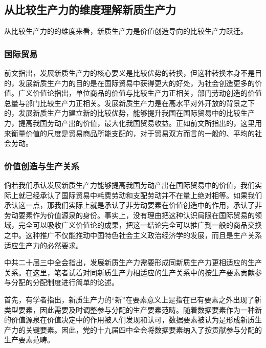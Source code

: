 \subsection{从比较生产力的维度理解新质生产力}

从比较生产力的的维度来看，新质生产力是价值创造导向的比较生产力跃迁。

\subsubsection{国际贸易}

前文指出，发展新质生产力的核心要义是比较优势的转换，但这种转换本身不是目的，发展新质生产力的目的是在国际贸易中获得更大的好处，为社会创造更多的价值。广义价值论指出，单位商品的价值与比较生产力正相关，部门劳动创造的价值总量与部门比较生产力正相关。发展新质生产力是在高水平对外开放的背景之下的\cite[518]{XiJinPingXiJinPingJingJiWenXuanDiYiJuan2025}，发展新质生产力建立新的比较优势，能够提升我国在国际贸易中的比较生产力，提高我国劳动产出的价值，最大化我国贸易收益\cite[76]{LiuLeYiJingTaiBiJiaoYouShiDongTaiHuaDeQuDongLiYuLiShiJingYanJianLunFaZhanXinZhiShengChanLiYuTiShengChanYeLianGongYingLianRenXingNeiYin2025}。正如前文所指出的，这里用来衡量价值的尺度是贸易商品所能支配的，对于贸易双方而言的一般的、平均的社会劳动。
\subsubsection{价值创造与生产关系}

倘若我们承认发展新质生产力能够提高我国劳动产出在国际贸易中的价值，我们实际上就已经承认了国际贸易中耗费劳动和支配劳动并不在量上绝对相等。如果我们承认这一点，那我们实际上就是承认了非劳动要素在价值创造中的作用，承认了非劳动要素作为价值源泉的身份。事实上，没有理由把这种认识局限在国际贸易的领域，完全可以吸收广义价值论的成果，把这一结论完全可以推广到一般的商品交换之中。这种推广不仅能推动中国特色社会主义政治经济学的发展，而且是生产关系适应生产力的必然要求。

中共二十届三中全会指出，发展新质生产力需要形成同新质生产力更相适应的生产关系\cite[11]{ZhongGongZhongYangGuanYuJinYiBuQuanMianShenHuaGaiGeTuiJinZhongGuoShiXianDaiHuaDeJueDing2024}。在这里，笔者试着对同新质生产力相适应的生产关系中的按生产要素贡献参与分配的分配制度进行简单的论述。

首先，有学者指出，新质生产力的“新”在要素意义上是指在已有要素之外出现了新类型要素\cite[138]{GaoFanXinZhiShengChanLiDeTiChuLuoJiDuoWeiNeiHanJiShiDaiYiYi2023}，因此需要及时调整参与分配的生产要素范畴。随着数据要素作为一种新的价值源泉在价值决定中的作用被人们发现和认可，数据要素被认为是形成新质生产力的关键要素\cite[18]{ChaoXiaoJingXinZhiShengChanLiQuDongGaoZhiLiangFaZhanDeLuoJiYuLuJing2024}\cite[138]{GaoFanXinZhiShengChanLiDeTiChuLuoJiDuoWeiNeiHanJiShiDaiYiYi2023}\cite{ZhangXiaHengShuJuYaoSuTuiJinXinZhiShengChanLiShiXianDeNeiZaiJiZhiYuLuJingYanJiu2024}。因此，党的十九届四中全会将数据要素纳入了按贡献参与分配的生产要素范畴\cite[39]{ZhongGuoGongChanDangDiShiJiuJieZhongYangWeiYuanHuiDiSiCiQuanTiHuiYiWenJianHuiBian2019}。

